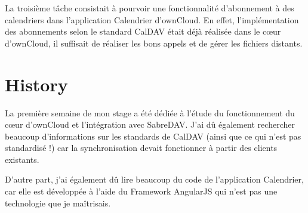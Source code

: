 \documentclass[10pt,a4paper]{report}
\begin{document}
	La troisième tâche consistait à pourvoir une fonctionnalité d'abonnement à des calendriers dans l'application Calendrier d'ownCloud. En effet, l'implémentation des abonnements selon le standard CalDAV était déjà réalisée dans le cœur d'ownCloud, il suffisait de réaliser les bons appels et de gérer les fichiers distants.
	
	\chapter{History}
	La première semaine de mon stage a été dédiée à l'étude du fonctionnement du cœur d'ownCloud et l'intégration avec SabreDAV. J'ai dû également rechercher beaucoup d'informations sur les standards de CalDAV (ainsi que ce qui n'est pas standardisé !) car la synchronisation devait fonctionner à partir des clients existants.
	
	D'autre part, j'ai également dû lire beaucoup du code de l'application Calendrier, car elle est développée à l'aide du Framework AngularJS qui n'est pas une technologie que je maîtrisais.
\end{document}
